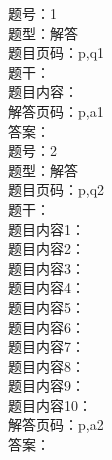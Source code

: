 \documentclass[11pt]{article}
\theoremstyle{definition}
\begin{document}
\begin{CJK*}{UTF8}{gbsn}
题号：1\\
题型：解答\\
题目页码：p,q1\\
题干：\\
题目内容：\\
解答页码：p,a1\\
答案：\\

题号：2\\
题型：解答\\
题目页码：p,q2\\
题干：\\
题目内容1：\\
题目内容2：\\
题目内容3：\\
题目内容4：\\
题目内容5：\\
题目内容6：\\
题目内容7：\\
题目内容8：\\
题目内容9：\\
题目内容10：\\
解答页码：p,a2\\
答案：\\
\\
\\
\\
\\
\\
\\
\\
\\
\\
\\
\\


\end{CJK*}
\end{document}
